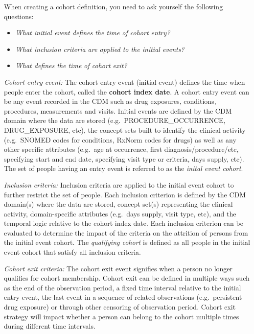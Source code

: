 \documentclass[11pt]{book}
\providecommand{\tightlist}{%
  \setlength{\itemsep}{0pt}\setlength{\parskip}{0pt}}
\theoremstyle{definition}
\theoremstyle{definition}
\theoremstyle{definition}
\theoremstyle{remark}
\begin{document}
When creating a cohort definition, you need to ask yourself the following questions:

\begin{itemize}
\tightlist
\item
  \emph{What initial event defines the time of cohort entry?}
\item
  \emph{What inclusion criteria are applied to the initial events?}
\item
  \emph{What defines the time of cohort exit?}
\end{itemize}

\emph{Cohort entry event:} The cohort entry event (initial event) defines the time when people enter the cohort, called the \textbf{cohort index date}. A cohort entry event can be any event recorded in the CDM such as drug exposures, conditions, procedures, measurements and visits. Initial events are defined by the CDM domain where the data are stored (e.g.~PROCEDURE\_OCCURRENCE, DRUG\_EXPOSURE, etc), the concept sets built to identify the clinical activity (e.g.~SNOMED codes for conditions, RxNorm codes for drugs) as well as any other specific attributes (e.g.~age at occurrence, first diagnosis/procedure/etc, specifying start and end date, specifying visit type or criteria, days supply, etc). The set of people having an entry event is referred to as the \emph{inital event cohort}. 

\emph{Inclusion criteria:} Inclusion criteria are applied to the initial event cohort to further restrict the set of people. Each inclusion criterion is defined by the CDM domain(s) where the data are stored, concept set(s) representing the clinical activity, domain-specific attributes (e.g.~days supply, visit type, etc), and the temporal logic relative to the cohort index date. Each inclusion criterion can be evaluated to determine the impact of the criteria on the attrition of persons from the initial event cohort. The \emph{qualifying cohort} is defined as all people in the initial event cohort that satisfy all inclusion criteria. 

\emph{Cohort exit criteria:} The cohort exit event signifies when a person no longer qualifies for cohort membership. Cohort exit can be defined in multiple ways such as the end of the observation period, a fixed time interval relative to the initial entry event, the last event in a sequence of related observations (e.g.~persistent drug exposure) or through other censoring of observation period. Cohort exit strategy will impact whether a person can belong to the cohort multiple times during different time intervals.
\end{document}

